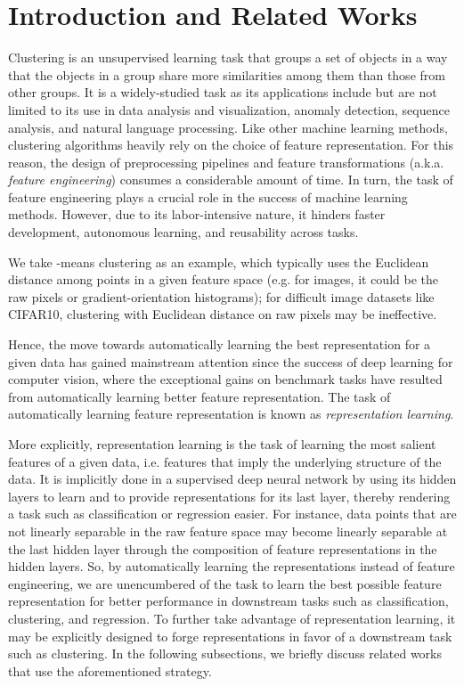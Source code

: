 \documentclass[conference]{IEEEtran}
\begin{document}
\section{Introduction and Related Works}
Clustering is an unsupervised learning task that groups a set of objects in a way that the objects in a group share more similarities among them than those from other groups. It is a widely-studied task as its applications include but are not limited to its use in data analysis and visualization, anomaly detection, sequence analysis, and natural language processing. Like other machine learning methods, clustering algorithms heavily rely on the choice of feature representation. For this reason, the design of preprocessing pipelines and feature transformations (a.k.a. \textit{feature engineering}) consumes a considerable amount of time. In turn, the task of feature engineering plays a crucial role in the success of machine learning methods. However, due to its labor-intensive nature, it hinders faster development, autonomous learning, and reusability across tasks.


We take -means clustering as an example, which typically uses the Euclidean distance among points in a given feature space (e.g. for images, it could be the raw pixels or gradient-orientation histograms); for difficult image datasets like CIFAR10\cite{krizhevsky2009learning}, clustering with Euclidean distance on raw pixels may be ineffective.

Hence, the move towards automatically learning the best representation for a given data has gained mainstream attention since the success of deep learning for computer vision\cite{he2016deep, krizhevsky2012imagenet, simonyan2014very}, where the exceptional gains on benchmark tasks have resulted from automatically learning better feature representation. The task of automatically learning feature representation is known as \textit{representation learning}.

More explicitly, representation learning is the task of learning the most salient features of a given data, i.e. features that imply the underlying structure of the data. It is implicitly done in a supervised deep neural network by using its hidden layers to learn and to provide representations for its last layer, thereby rendering a task such as classification or regression easier. For instance, data points that are not linearly separable in the raw feature space may become linearly separable at the last hidden layer through the composition of feature representations in the hidden layers. So, by automatically learning the representations instead of feature engineering, we are unencumbered of the task to learn the best possible feature representation for better performance in downstream tasks such as classification, clustering, and regression.
To further take advantage of representation learning, it may be explicitly designed to forge representations in favor of a downstream task such as clustering. In the following subsections, we briefly discuss related works that use the aforementioned strategy.
\end{document}

